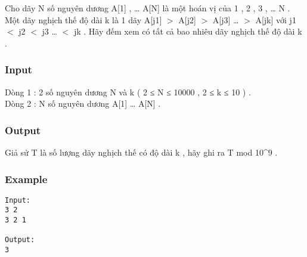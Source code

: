 



   Cho dãy N số nguyên dương A[1] , … A[N] là một hoán vị của 1 , 2 , 3 , … N .   
\\   Một dãy nghịch thế độ dài k là 1 dãy A[j1] $>$ A[j2] $>$ A[j3] … $>$ A[jk] với j1 $<$ j2 $<$ j3 … $<$ jk . Hãy đếm xem có tất cả bao nhiêu dãy nghịch thế độ dài k .  

\subsubsection{   Input  }

   Dòng 1 : 2 số nguyên dương N và k ( 2 ≤ N ≤ 10000 , 2 ≤ k ≤ 10 ) .   
\\   Dòng 2 : N số nguyên dương A[1] … A[N] .  

\subsubsection{   Output  }

   Giả sử T là số lượng dãy nghịch thế có độ dài k , hãy ghi ra T mod 10^9 .  

\subsubsection{   Example  }
\begin{verbatim}
Input:
3 2
3 2 1

Output:
3
\end{verbatim}

